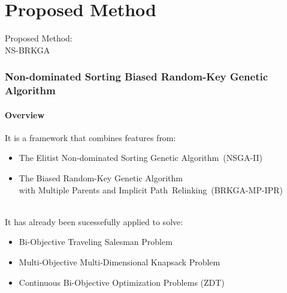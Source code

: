 \documentclass[
	11pt, %
	aspectratio=169, %
]{beamer}
\begin{document}
\section{Proposed Method}

\begin{frame}[plain]
\begin{center}
{\Huge Proposed Method:\\
\textsc{NS-BRKGA}}
\end{center}
\end{frame}

\begin{frame}
\frametitle{Non-dominated Sorting Biased Random-Key Genetic Algorithm}
\framesubtitle{Overview}

It is a framework that combines features from:
\begin{itemize}
\item The Elitist Non-dominated Sorting Genetic Algorithm~(\textsc{NSGA-II})
\item The Biased Random-Key Genetic Algorithm\\with Multiple Parents and Implicit Path~Relinking~(\textsc{BRKGA-MP-IPR})
\end{itemize}

~\\

It has already been sucessefully applied to solve:
\begin{itemize}
\item Bi-Objective Traveling Salesman Problem
\item Multi-Objective Multi-Dimensional Knapsack Problem
\item Continuous Bi-Objective Optimization Problems (ZDT)
\end{itemize}
\end{frame}
\end{document}

